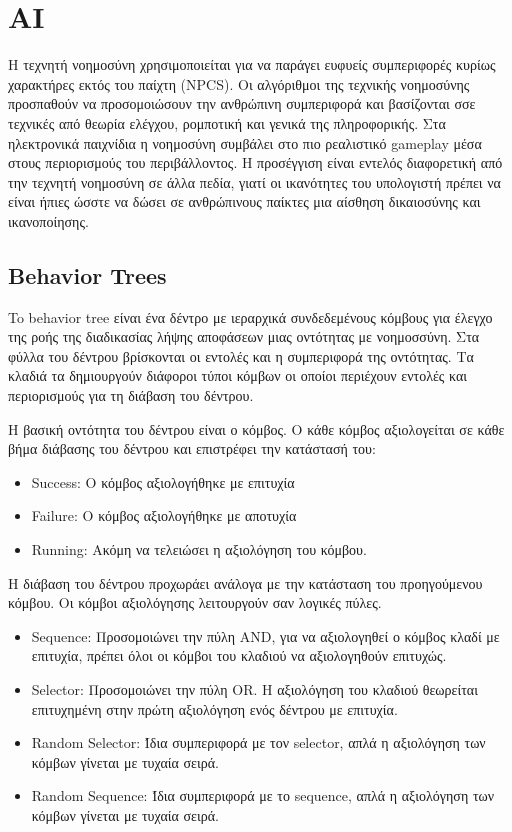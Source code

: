 \section{ΑΙ}
Η τεχνητή νοημοσύνη χρησιμοποιείται για να παράγει ευφυείς συμπεριφορές κυρίως χαρακτήρες εκτός του παίχτη (NPCS). Οι αλγόριθμοι της τεχνικής νοημοσύνης προσπαθούν να προσομοιώσουν την ανθρώπινη συμπεριφορά και βασίζονται σσε τεχνικές από θεωρία ελέγχου, ρομποτική και γενικά της πληροφορικής. Στα ηλεκτρονικά παιχνίδια η νοημοσύνη συμβάλει στο πιο ρεαλιστικό gameplay μέσα στους περιορισμούς του περιβάλλοντος. Η προσέγγιση είναι εντελός διαφορετική από την τεχνητή νοημοσύνη σε άλλα πεδία, γιατί οι ικανότητες του υπολογιστή πρέπει να είναι ήπιες ώσστε να δώσει σε ανθρώπινους παίκτες μια αίσθηση δικαιοσύνης και ικανοποίησης.
 
\subsection{Behavior Trees}	
To behavior tree είναι ένα δέντρο με ιεραρχικά συνδεδεμένους κόμβους για έλεγχο της ροής της διαδικασίας λήψης αποφάσεων μιας οντότητας με νοημοσσύνη. Στα φύλλα του δέντρου βρίσκονται οι εντολές και η συμπεριφορά της οντότητας. Τα κλαδιά τα δημιουργούν διάφοροι τύποι κόμβων οι οποίοι περιέχουν εντολές και περιορισμούς για τη διάβαση του δέντρου.

Η βασική οντότητα του δέντρου είναι ο κόμβος. Ο κάθε κόμβος αξιολογείται σε κάθε βήμα διάβασης του δέντρου και επιστρέφει την κατάστασή του:
\begin{itemize}
	\item Success: Ο κόμβος αξιολογήθηκε με επιτυχία
	\item Failure: Ο κόμβος αξιολογήθηκε με αποτυχία
	\item Running: Ακόμη να τελειώσει η αξιολόγηση του κόμβου.
\end{itemize}

Η διάβαση του δέντρου προχωράει ανάλογα με την κατάσταση του προηγούμενου κόμβου. Οι κόμβοι αξιολόγησης λειτουργούν σαν λογικές πύλες.

\begin{itemize}
	\item Sequence: Προσομοιώνει την πύλη AND, για να αξιολογηθεί ο κόμβος κλαδί με επιτυχία, πρέπει όλοι οι κόμβοι του κλαδιού να αξιολογηθούν επιτυχώς.
	\item Selector: Προσομοιώνει την πύλη ΟR. Η αξιολόγηση του κλαδιού θεωρείται επιτυχημένη στην πρώτη αξιολόγηση ενός δέντρου με επιτυχία.
	\item Random Selector: Ίδια συμπεριφορά με τον selector, απλά η αξιολόγηση των κόμβων γίνεται με τυχαία σειρά.
	\item Random Sequence: Ίδια συμπεριφορά με το sequence, απλά η αξιολόγηση των κόμβων γίνεται με τυχαία σειρά.
\end{itemize}
	
